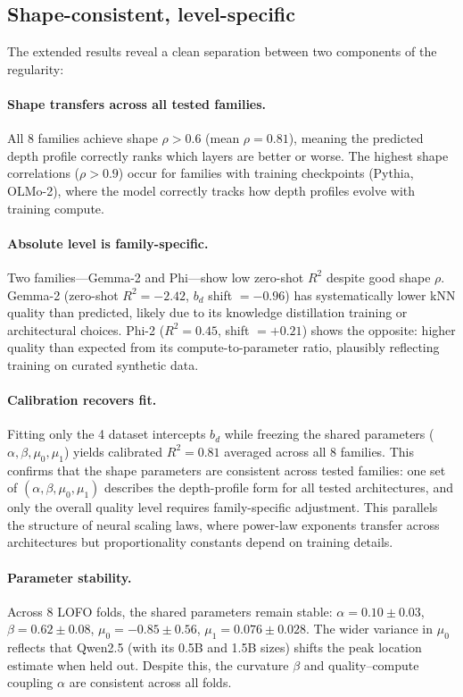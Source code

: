 \documentclass{article}
\begin{document}
\subsection{Shape-consistent, level-specific}

The extended results reveal a clean separation between two components of the regularity:

\paragraph{Shape transfers across all tested families.} All 8 families achieve shape $\rho > 0.6$ (mean $\rho = 0.81$), meaning the predicted depth profile correctly ranks which layers are better or worse. The highest shape correlations ($\rho > 0.9$) occur for families with training checkpoints (Pythia, OLMo-2), where the model correctly tracks how depth profiles evolve with training compute.

\paragraph{Absolute level is family-specific.} Two families---Gemma-2 and Phi---show low zero-shot $R^2$ despite good shape $\rho$. Gemma-2 (zero-shot $R^2 = -2.42$, $b_d$ shift $= -0.96$) has systematically lower kNN quality than predicted, likely due to its knowledge distillation training or architectural choices. Phi-2 ($R^2 = 0.45$, shift $= +0.21$) shows the opposite: higher quality than expected from its compute-to-parameter ratio, plausibly reflecting training on curated synthetic data.

\paragraph{Calibration recovers fit.} Fitting only the 4 dataset intercepts $b_d$ while freezing the shared parameters ($\alpha, \beta, \mu_0, \mu_1$) yields calibrated $R^2 = 0.81$ averaged across all 8 families. This confirms that the shape parameters are consistent across tested families: one set of $(\alpha, \beta, \mu_0, \mu_1)$ describes the depth-profile form for all tested architectures, and only the overall quality level requires family-specific adjustment. This parallels the structure of neural scaling laws, where power-law exponents transfer across architectures but proportionality constants depend on training details.

\paragraph{Parameter stability.} Across 8 LOFO folds, the shared parameters remain stable: $\alpha = 0.10 \pm 0.03$, $\beta = 0.62 \pm 0.08$, $\mu_0 = -0.85 \pm 0.56$, $\mu_1 = 0.076 \pm 0.028$. The wider variance in $\mu_0$ reflects that Qwen2.5 (with its 0.5B and 1.5B sizes) shifts the peak location estimate when held out. Despite this, the curvature $\beta$ and quality--compute coupling $\alpha$ are consistent across all folds.
\end{document}
